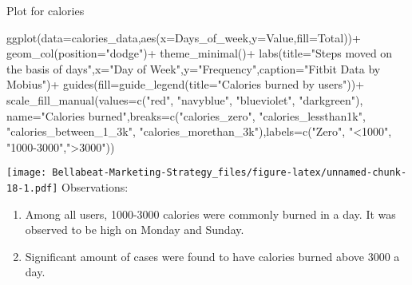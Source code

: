 \documentclass[
]{article}
\newenvironment{Shaded}{\begin{snugshade}}{\end{snugshade}}
\newcommand{\AttributeTok}[1]{\textcolor[rgb]{0.77,0.63,0.00}{#1}}
\newcommand{\FunctionTok}[1]{\textcolor[rgb]{0.00,0.00,0.00}{#1}}
\newcommand{\NormalTok}[1]{#1}
\newcommand{\SpecialCharTok}[1]{\textcolor[rgb]{0.00,0.00,0.00}{#1}}
\newcommand{\StringTok}[1]{\textcolor[rgb]{0.31,0.60,0.02}{#1}}
\providecommand{\tightlist}{%
  \setlength{\itemsep}{0pt}\setlength{\parskip}{0pt}}
\begin{document}
Plot for calories

\begin{Shaded}
\begin{Highlighting}[]
\FunctionTok{ggplot}\NormalTok{(}\AttributeTok{data=}\NormalTok{calories\_data,}\FunctionTok{aes}\NormalTok{(}\AttributeTok{x=}\NormalTok{Days\_of\_week,}\AttributeTok{y=}\NormalTok{Value,}\AttributeTok{fill=}\NormalTok{Total))}\SpecialCharTok{+}
  \FunctionTok{geom\_col}\NormalTok{(}\AttributeTok{position=}\StringTok{"dodge"}\NormalTok{)}\SpecialCharTok{+}
  \FunctionTok{theme\_minimal}\NormalTok{()}\SpecialCharTok{+}
  \FunctionTok{labs}\NormalTok{(}\AttributeTok{title=}\StringTok{"Steps moved on the basis of days"}\NormalTok{,}\AttributeTok{x=}\StringTok{"Day of Week"}\NormalTok{,}\AttributeTok{y=}\StringTok{"Frequency"}\NormalTok{,}\AttributeTok{caption=}\StringTok{"Fitbit Data by Mobius"}\NormalTok{)}\SpecialCharTok{+}
  \FunctionTok{guides}\NormalTok{(}\AttributeTok{fill=}\FunctionTok{guide\_legend}\NormalTok{(}\AttributeTok{title=}\StringTok{"Calories burned by users"}\NormalTok{))}\SpecialCharTok{+}
  \FunctionTok{scale\_fill\_manual}\NormalTok{(}\AttributeTok{values=}\FunctionTok{c}\NormalTok{(}\StringTok{"red"}\NormalTok{, }\StringTok{"navyblue"}\NormalTok{, }\StringTok{"blueviolet"}\NormalTok{, }\StringTok{"darkgreen"}\NormalTok{), }\AttributeTok{name=}\StringTok{"Calories burned"}\NormalTok{,}\AttributeTok{breaks=}\FunctionTok{c}\NormalTok{(}\StringTok{"calories\_zero"}\NormalTok{, }\StringTok{"calories\_lessthan1k"}\NormalTok{, }\StringTok{"calories\_between\_1\_3k"}\NormalTok{, }\StringTok{"calories\_morethan\_3k"}\NormalTok{),}\AttributeTok{labels=}\FunctionTok{c}\NormalTok{(}\StringTok{"Zero"}\NormalTok{, }\StringTok{"\textless{}1000"}\NormalTok{, }\StringTok{"1000{-}3000"}\NormalTok{,}\StringTok{"\textgreater{}3000"}\NormalTok{))}
\end{Highlighting}
\end{Shaded}

\texttt{[image: Bellabeat-Marketing-Strategy\_files/figure-latex/unnamed-chunk-18-1.pdf]}
Observations:

\begin{enumerate}
\def\labelenumi{\arabic{enumi}.}
\tightlist
\item
  Among all users, 1000-3000 calories were commonly burned in a day. It
  was observed to be high on Monday and Sunday.
\item
  Significant amount of cases were found to have calories burned above
  3000 a day.
\end{enumerate}
\end{document}
